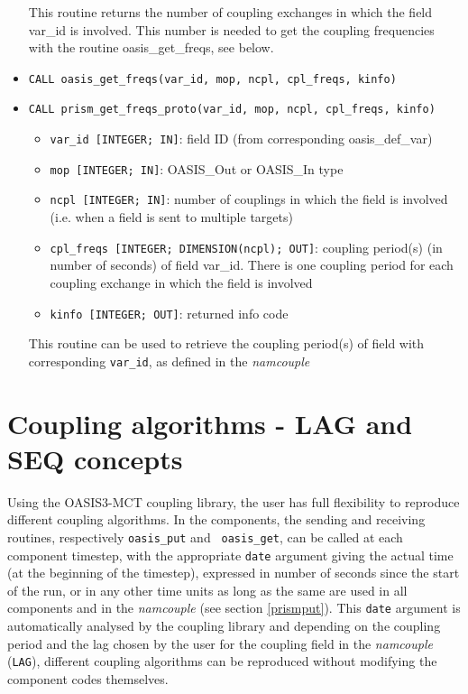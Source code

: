 \begin{itemize}
This routine returns the number of coupling exchanges in which the field var\_id is
involved. This number is needed to get the coupling frequencies with the
routine oasis\_get\_freqs, see below.

\item {\tt CALL oasis\_get\_freqs(var\_id, mop, ncpl, cpl\_freqs, kinfo)}
\item {\tt CALL prism\_get\_freqs\_proto(var\_id, mop, ncpl, cpl\_freqs, kinfo)}
  \begin{itemize}
  \item {\tt var\_id [INTEGER; IN]}: field ID (from
  corresponding oasis\_def\_var)
  \item {\tt mop [INTEGER; IN]}: OASIS\_Out or OASIS\_In type
  \item {\tt ncpl [INTEGER; IN]}: number of couplings in which the field
  is involved (i.e. when a field is sent to multiple targets)
   \item {\tt cpl\_freqs [INTEGER; DIMENSION(ncpl); OUT]}: coupling period(s) 
  (in number of seconds) of field var\_id. There is one coupling period for
  each coupling exchange in which the field is involved
  \item {\tt kinfo [INTEGER; OUT]}: returned info code
  \end{itemize}

This routine can be used to retrieve the coupling period(s) of field with
corresponding {\tt var\_id}, as defined in the {\it namcouple}

\end{itemize}

\section{Coupling algorithms - LAG and SEQ concepts}
\label{subsubsec_Algoritms}

Using the OASIS3-MCT coupling library, the user has full flexibility
to reproduce different coupling algorithms. In the components, the
sending and receiving routines, respectively {\tt oasis\_put} and {\tt
  oasis\_get}, can be called at each component timestep, with the
appropriate {\tt date} argument giving the actual time (at the
beginning of the timestep), expressed in number of seconds since the
start of the run, or in any other time units as long as the same are
used in all components and in the {\it namcouple} (see section
\ref{prismput}). This {\tt date} argument is automatically analysed by
the coupling library and depending on the coupling period and the lag chosen by the user for the coupling field in the {\it namcouple} ({\tt LAG}), different coupling algorithms can be reproduced
without modifying the component codes themselves.

